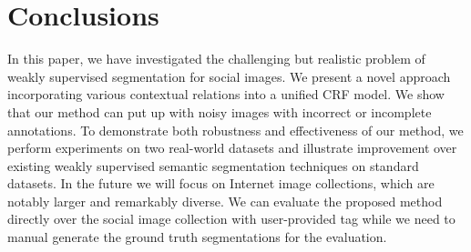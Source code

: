 \section{Conclusions}
In this paper, we have investigated the challenging but realistic problem of weakly supervised segmentation for social images. We present a novel approach incorporating various contextual relations into a unified CRF model. We show that our method can put up with noisy images with incorrect or incomplete annotations. To demonstrate both robustness and effectiveness of our method, we perform experiments on two real-world datasets and illustrate improvement over existing weakly supervised semantic segmentation techniques on standard datasets. In the future we will focus on Internet image collections, which are notably larger and remarkably diverse. We can evaluate the proposed method directly over the social image collection with user-provided tag while we need to manual generate the ground truth segmentations for the evaluation.
